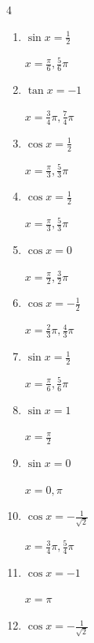 \begin{multicols}{4}
\begin{enumerate}
        $\displaystyle x = \frac{\pi}{4} , \frac{7}{4}\pi$

  \item $\displaystyle \sin{x}  = \frac{1}{2}$

        $\displaystyle x = \frac{\pi}{6} , \frac{5}{6}\pi$

  \item $\displaystyle \tan{x}  = -1$

        $\displaystyle x = \frac{3}{4}\pi , \frac{7}{4}\pi$

  \item $\displaystyle \cos{x}  = \frac{1}{2}$

        $\displaystyle x = \frac{\pi}{3} , \frac{5}{3}\pi$

  \item $\displaystyle \cos{x}  = \frac{1}{2}$

        $\displaystyle x = \frac{\pi}{3} , \frac{5}{3}\pi$

  \item $\displaystyle \cos{x}  = 0$

        $\displaystyle x = \frac{\pi}{2} , \frac{3}{2}\pi$

\columnbreak %

  \item $\displaystyle \cos{x}  = -\frac{1}{2}$

        $\displaystyle x = \frac{2}{3}\pi , \frac{4}{3}\pi$

  \item $\displaystyle \sin{x}  = \frac{1}{2}$

        $\displaystyle x = \frac{\pi}{6} , \frac{5}{6}\pi$

  \item $\displaystyle \sin{x}  = 1$

        $\displaystyle x = \frac{\pi}{2}$

  \item $\displaystyle \sin{x}  = 0$

        $\displaystyle x = 0 , \pi$

  \item $\displaystyle \cos{x}  = -\frac{1}{\sqrt{2}}$

        $\displaystyle x = \frac{3}{4}\pi , \frac{5}{4}\pi$

  \item $\displaystyle \cos{x}  = -1$

        $\displaystyle x = \pi$

  \item $\displaystyle \cos{x}  = -\frac{1}{\sqrt{2}}$


\end{enumerate}
\end{multicols}
